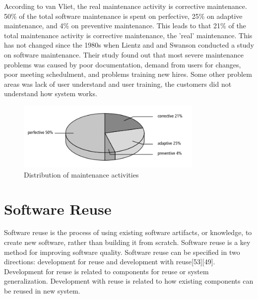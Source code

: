 According to van Vliet, the real maintenance activity is corrective maintenance\cite{Vliet:2008:SEP:1481475}. 50\% of the total software maintenance is spent on perfective, 25\% on adaptive maintenance, and 4\% on preventive maintenance. This leads to that 21\% of the total maintenance activity is corrective maintenance, the 'real' maintenance\cite{Vliet:2008:SEP:1481475}. This has not changed since the 1980s when Lientz and and Swanson conducted a study on software maintenance\cite{lientz1980software}. Their study found out that most severe maintenance problems was caused by poor documentation, demand from users for changes, poor meeting schedulment, and problems training new hires.  Some other problem areas was lack of user understand and user training, the customers did not understand how system works.

\begin{figure}
	\centering
	\includegraphics[width=0.8\textwidth]{images/maintenance.png}
	\caption{Distribution of maintenance activities\cite{Vliet:2008:SEP:1481475}}
	\label{fig:maintenanceActivities}
\end{figure}





\section{Software Reuse}
Software reuse is the process of using existing software artifacts, or knowledge, to create new software, rather than building it from scratch. Software reuse is a key method for improving software quality\cite{frakes1996software}. Software reuse can be specified in two directions: development for reuse and development with reuse[53][49]. Development for reuse is related to components for reuse or system generalization. Development with reuse is related to how existing components can be reused in new system.

